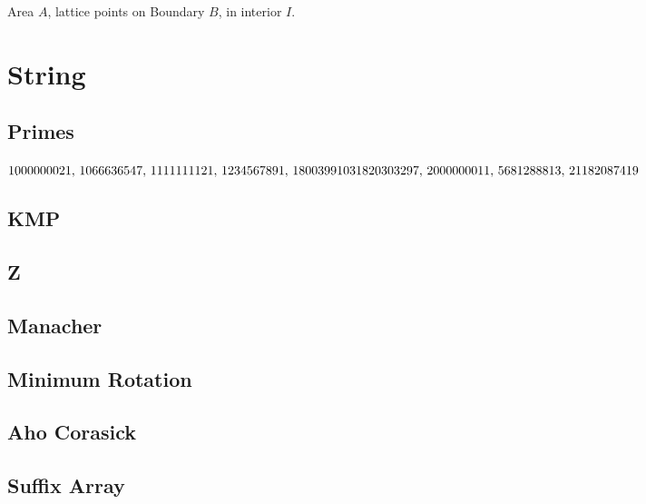 \documentclass[10pt,a4paper,twocolumn,oneside]{article}
\begin{document}
			Area $A$, lattice points on Boundary $B$, in interior $I$.
	\section{String}	
		\subsection{Primes}
			$1000000021,\,1066636547,\,1111111121,\,1234567891,\,1800399103\\1820303297,\,2000000011,\,5681288813,\,21182087419$
		\subsection{KMP}
			
		\subsection{Z}
			
		\subsection{Manacher}
			
		\subsection{Minimum Rotation}
			
		\subsection{Aho Corasick}
			
		\subsection{Suffix Array}
			
\end{document}
